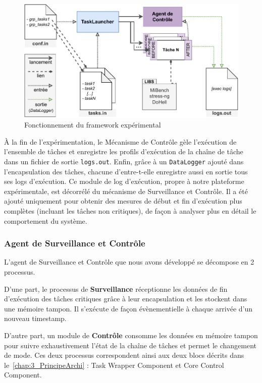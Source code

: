 \documentclass[french, a4paper, 11pt, twoside, pdftex]{StyleThese}
\begin{document}
    \begin{figure}[ht]
    	\centering
    	\includegraphics[width=\linewidth]{schemas/Implementation_Archi}
    	\caption{Fonctionnement du framework expérimental}
    	\label{fig:implementationarchi}
    \end{figure}

    À la fin de l'expérimentation, le Mécanisme de Contrôle gèle l'exécution de l'ensemble de tâches et enregistre les profils d'exécution de la chaîne de tâche dans un fichier de sortie \texttt{logs.out}.  Enfin, grâce à un \texttt{DataLogger} ajouté dans l'encapsulation des tâches, chacune d'entre-t-elle enregistre aussi en sortie tous ses logs d'exécution. Ce module de log d'exécution, propre à notre plateforme expérimentale, est décorrélé du mécanisme de Surveillance et Contrôle. Il a été ajouté uniquement pour obtenir des mesures de début et fin d'exécution plus complètes (incluant les tâches non critiques), de façon à analyser plus en détail le comportement du système.
        
    	\subsubsection{Agent de Surveillance et Contrôle}

	L'agent de Surveillance et Contrôle que nous avons développé se décompose en 2 processus. 
	
	D'une part, le processus de \textbf{Surveillance} réceptionne les données de fin d'exécution des tâches critiques grâce à leur encapsulation et les stockent dans une mémoire tampon. Il s'exécute de façon évènementielle à chaque arrivée d'un nouveau timestamp. 
	
	D'autre part, un module de \textbf{Contrôle} consomme les données en mémoire tampon pour suivre exhaustivement l'état de la chaîne de tâches et permet le changement de mode. Ces deux processus correspondent ainsi aux deux blocs décrits dans le~\autoref{chap:3_PrincipeArchi} : Task Wrapper Component et Core Control Component.
	
\end{document}
